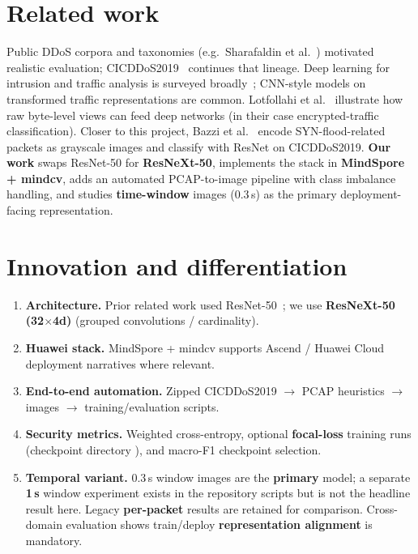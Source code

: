 \documentclass[11pt,a4paper]{article}
\begin{document}
\section{Related work}

Public DDoS corpora and taxonomies (e.g.\ Sharafaldin et al.~\cite{sharafaldin2018developing}) motivated realistic evaluation; CICDDoS2019~\cite{cicddos2019} continues that lineage. Deep learning for intrusion and traffic analysis is surveyed broadly~\cite{vinayakumar2019deep}; CNN-style models on transformed traffic representations are common. Lotfollahi et al.~\cite{lotfollahi2020deep} illustrate how raw byte-level views can feed deep networks (in their case encrypted-traffic classification). Closer to this project, Bazzi et al.~\cite{bazzi2020resnet} encode SYN-flood-related packets as grayscale images and classify with ResNet on CICDDoS2019. \textbf{Our work} swaps ResNet-50 for \textbf{ResNeXt-50}, implements the stack in \textbf{MindSpore + mindcv}, adds an automated PCAP-to-image pipeline with class imbalance handling, and studies \textbf{time-window} images (0.3\,s) as the primary deployment-facing representation.

\section{Innovation and differentiation}

\begin{enumerate}[leftmargin=*]
  \item \textbf{Architecture.} Prior related work used ResNet-50~\cite{bazzi2020resnet}; we use \textbf{ResNeXt-50 (32$\times$4d)} (grouped convolutions / cardinality).
  \item \textbf{Huawei stack.} MindSpore + mindcv supports Ascend / Huawei Cloud deployment narratives where relevant.
  \item \textbf{End-to-end automation.} Zipped CICDDoS2019 $\rightarrow$ PCAP heuristics $\rightarrow$ images $\rightarrow$ training/evaluation scripts.
  \item \textbf{Security metrics.} Weighted cross-entropy, optional \textbf{focal-loss} training runs (checkpoint directory ), and macro-F1 checkpoint selection.
  \item \textbf{Temporal variant.} 0.3\,s window images are the \textbf{primary} model; a separate \textbf{1\,s} window experiment exists in the repository scripts but is not the headline result here. Legacy \textbf{per-packet} results are retained for comparison. Cross-domain evaluation shows train/deploy \textbf{representation alignment} is mandatory.
\end{enumerate}
\end{document}
